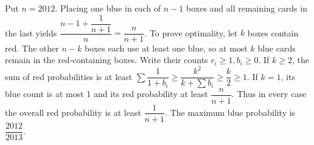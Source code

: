 Put $n=2012$. Placing one blue in each of $n-1$ boxes and all remaining cards in the last yields $\dfrac{n-1+\dfrac{1}{n+1}}{n}=\dfrac{n}{n+1}$. To prove optimality, let $k$ boxes contain red. The other $n-k$ boxes each use at least one blue, so at most $k$ blue cards remain in the red-containing boxes. Write their counts $r_i\ge1,b_i\ge0$. If $k\ge2$, the sum of red probabilities is at least $\sum\dfrac{1}{1+b_i}\ge\dfrac{k^2}{k+\sum b_i}\ge\dfrac{k}{2}\ge1$. If $k=1$, its blue count is at most 1 and its red probability at least $\dfrac{n}{n+1}$. Thus in every case the overall red probability is at least $\dfrac{1}{n+1}$. The maximum blue probability is $\boxed{\dfrac{2012}{2013}}$.
